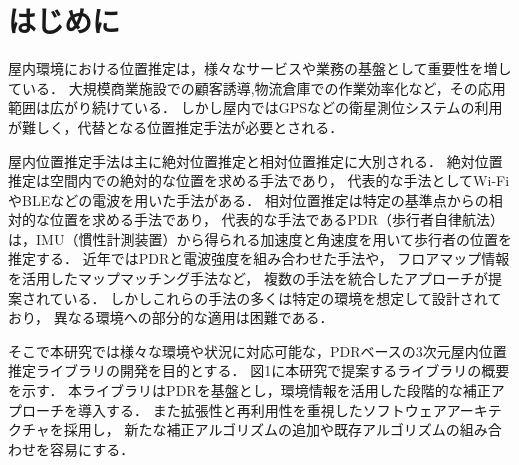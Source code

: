 \documentclass[a4paper, 10pt, twocolumn]{jarticle}
\begin{document}


\section{はじめに}


屋内環境における位置推定は，様々なサービスや業務の基盤として重要性を増している．
大規模商業施設での顧客誘導,物流倉庫での作業効率化など，その応用範囲は広がり続けている．
しかし屋内ではGPSなどの衛星測位システムの利用が難しく，代替となる位置推定手法が必要とされる．

屋内位置推定手法は主に絶対位置推定と相対位置推定に大別される．
絶対位置推定は空間内での絶対的な位置を求める手法であり，
代表的な手法としてWi-FiやBLEなどの電波を用いた手法がある．
相対位置推定は特定の基準点からの相対的な位置を求める手法であり，
代表的な手法であるPDR（歩行者自律航法）は，IMU（慣性計測装置）から得られる加速度と角速度を用いて歩行者の位置を推定する．
近年ではPDRと電波強度を組み合わせた手法\cite{pdr-rss-fusion}や，
フロアマップ情報を活用したマップマッチング手法\cite{pdr-map}など，
複数の手法を統合したアプローチが提案されている．
しかしこれらの手法の多くは特定の環境を想定して設計されており，
異なる環境への部分的な適用は困難である．

そこで本研究では様々な環境や状況に対応可能な，PDRベースの3次元屋内位置推定ライブラリの開発を目的とする．
図1に本研究で提案するライブラリの概要を示す．
本ライブラリはPDRを基盤とし，環境情報を活用した段階的な補正アプローチを導入する．
また拡張性と再利用性を重視したソフトウェアアーキテクチャを採用し，
新たな補正アルゴリズムの追加や既存アルゴリズムの組み合わせを容易にする．
\end{document}
